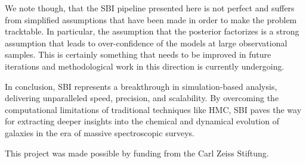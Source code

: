 \documentclass{aa}
\begin{document}
We note though, that the SBI pipeline presented here is not perfect and suffers from simplified assumptions that have been made in order to make the problem tracktable. In particular, the assumption that the  posterior factorizes is a strong assumption that leads to over-confidence of the models at large observational samples. This is certainly something that needs to be improved in future iterations and methodological work in this direction is currently undergoing. 

In conclusion, SBI represents a breakthrough in simulation-based analysis, delivering unparalleled speed, precision, and scalability. By overcoming the computational limitations of traditional techniques like HMC, SBI paves the way for extracting deeper insights into the chemical and dynamical evolution of galaxies in the era of massive spectroscopic surveys.



\begin{acknowledgements}
      This project was made possible by funding from the Carl Zeiss Stiftung.
\end{acknowledgements}

%
%



\end{document}

